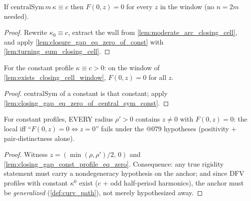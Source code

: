 \begin{lemma}\leanok
[the $t=0$ gap map vanishes identically when $\kappa^0$ is constant]
  \label{lem:closing_gap_eq_zero_of_central_sym_const}
  If $\mathrm{centralSym}\,m\,\kappa \equiv c$ then $F(0, z) = 0$ for every
  $z$ in the window (no $n = 2m$ needed).
\end{lemma}
\begin{proof}

\leanok
  Rewrite $\kappa_0 \equiv c$, extract the wall from
  \cref{lem:moderate_arc_closing_cell}, and apply
  \cref{lem:closure_gap_eq_zero_of_const} with
  \cref{lem:turning_sum_closing_cell}.
\end{proof}

\begin{lemma}
  \label{lem:closing_gap_const_profile_eq_zero}
  For the constant profile $\kappa \equiv c > 0$: on the window of
  \cref{lem:exists_closing_cell_window}, $F(0, z) = 0$ for all $z$.
\end{lemma}
\begin{proof}

\leanok
  $\mathrm{centralSym}$ of a constant is that constant; apply
  \cref{lem:closing_gap_eq_zero_of_central_sym_const}.
\end{proof}

\begin{lemma}
  \label{lem:closing_gap_zero_iff_fails_of_const}
  For constant profiles, EVERY radius $\rho' > 0$ contains $z \ne 0$ with
  $F(0, z) = 0$: the local iff ``$F(0,z) = 0 \iff z = 0$'' fails under the
  @079 hypotheses (positivity + pair-distinctness alone).
\end{lemma}
\begin{proof}

\leanok
  Witness $z = (\min(\rho, \rho')/2,\, 0)$ and
  \cref{lem:closing_gap_const_profile_eq_zero}. Consequence: any true rigidity
  statement must carry a nondegeneracy hypothesis on the anchor; and since
  $\mathrm{DFV}$ profiles with constant $\kappa^0$ exist ($c$ + odd
  half-period harmonics), the anchor must be \emph{generalized}
  (\cref{def:curv_path}), not merely hypothesized away.
\end{proof}

